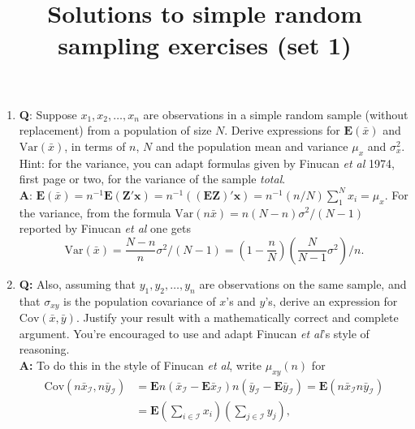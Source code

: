\documentclass{article}
\title{Solutions to simple random sampling exercises (set 1)}
\begin{document}
\maketitle

\begin{enumerate}
\item \textbf{Q}: Suppose $x_1, x_2, \ldots, x_n$ are observations in a
    simple random sample (without replacement) from a population of size
    $N$. Derive expressions for $\mathbf{E}(\bar x)$ and
    $\mathrm{Var}(\bar x)$, in terms of $n$, $N$ and the population mean
    and variance $\mu_x$ and $\sigma^2_x$. Hint: for the variance, you
    can adapt formulas given by Finucan \textit{et al} 1974, first page or two,
    for the variance of the sample \emph{total}.\\ 
\textbf{A}: $\mathbf{E}(\bar x) = n^{-1} \mathbf{E} (\mathbf{Z}'\mathbf{x}) = n^{-1} \left( (\mathbf{E} \mathbf{Z})'\mathbf{x}\right) = n^{-1}(n/N)\sum_{1}^{N} x_{i} = \mu_{x}. $  For the variance, from the formula $\mathrm{Var} (n \bar x) =  n(N-n) \sigma^{2}/(N-1)$ reported by Finucan \textit{et al} one gets 
\begin{equation}\label{eq:1}
\mathrm{Var} ( \bar x) =  \frac{N-n}{n} \sigma^{2}/(N-1) =  \left(1-
  \frac{n}{N}\right) \left(\frac{N}{N-1} \sigma^{2}\right)/n .
\end{equation}
\item \textbf{Q:} Also, assuming that
    $y_1, y_2, \ldots, y_n$ are observations on the same sample, and
    that $\sigma_{xy}$ is the population covariance of $x$'s and $y$'s,
    derive an expression for $\mathrm{Cov}(\bar x, \bar y) $. Justify
    your result with a mathematically correct and complete argument.
    You're encouraged to use and adapt Finucan \textit{et al}'s style of
    reasoning.\\ 
\textbf{A:} To do this in the style of Finucan \textit{et al}, write $\mu_{xy}(n) $ for 
  \begin{align*}
\mathrm{Cov} (n\bar{x}_{\mathcal{I}}, n\bar{y}_{\mathcal{I}}) &=  \mathbf{E}n\left(\bar{x}_{\mathcal{I}} - \mathbf{E}\bar{x}_{\mathcal{I}} \right) n\left(\bar{y}_{\mathcal{I}} - \mathbf{E}\bar{y}_{\mathcal{I}} \right) = \mathbf{E} (n\bar{x}_{\mathcal{I}} n \bar{y}_{\mathcal{I}})\\
&= \mathbf{E}(\sum _{i \in \mathcal{I}}{x}_{i} )(\sum _{j \in \mathcal{I}}{y}_{j}),    
  \end{align*}
 

\end{enumerate}
\end{document}
